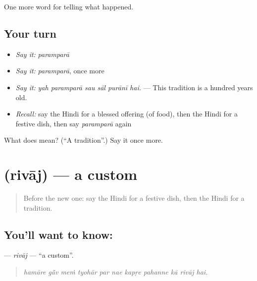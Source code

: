 \begin{grammarlens}[title={What you've built}]
One more word for telling what happened.
\end{grammarlens}

\subsection*{Your turn}
\begin{itemize}
\raggedright
  \item \emph{Say it:} \emph{paramparā}
  \item \emph{Say it:} \emph{paramparā}, once more
  \item \emph{Say it:} \emph{yah paramparā sau sāl purānī hai.} — This tradition is a hundred years old.
  \item \emph{Recall:} say the Hindi for a blessed offering (of food), then the Hindi for a festive dish, then say \emph{paramparā} again
\end{itemize}

\begin{tcolorbox}[breakable,colback=teal!4,colframe=teal!35!black,title={Before you move on}]
What does  mean? (\textquotedblleft{}A tradition\textquotedblright{}.) Say it once more.
\end{tcolorbox}
\section[\texorpdfstring{\hi{रिवाज} (rivāj)}{रिवाज (rivāj)}]{ (rivāj) — a custom}

\label{lesson:HI-C332-rivaj}



\begin{quote}
Before the new one: say the Hindi for a festive dish, then the Hindi for a tradition.
\end{quote}

\subsection*{You'll want to know: }
\textbf{} — \emph{rivāj} — \textquotedblleft{}a custom\textquotedblright{}.

\begin{quote}
          
\end{quote}

\begin{quote}
\emph{hamāre gā̃v meṁ tyohār par nae kapṛe pahanne kā rivāj hai.}
\end{quote}

